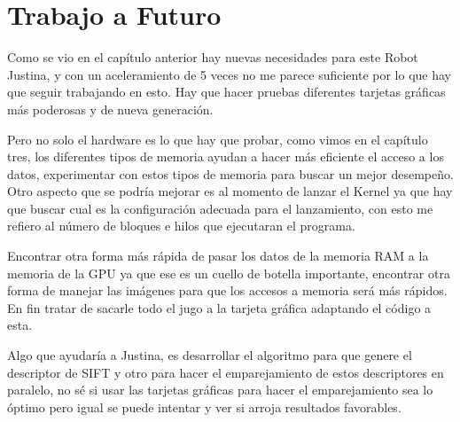  
 
 \chapter{Trabajo a Futuro}

Como se vio en el capítulo anterior hay nuevas necesidades para este Robot Justina, y con un aceleramiento de 5 veces no me parece suficiente  por lo que hay que seguir trabajando en esto. Hay que hacer pruebas diferentes tarjetas gráficas más poderosas y de nueva generación.

Pero no solo el hardware es lo que hay que probar, como vimos en el capítulo tres, los diferentes tipos de memoria ayudan a hacer más eficiente el acceso a los datos, experimentar con estos tipos de memoria para buscar un mejor desempeño. Otro aspecto que se podría mejorar es al momento de lanzar el Kernel ya que hay que buscar cual es la configuración adecuada para el lanzamiento, con esto me refiero al número de bloques e hilos que ejecutaran el programa. 

Encontrar otra forma más rápida de pasar los datos de la memoria RAM a la memoria de la GPU ya que ese es un cuello de botella importante, encontrar otra forma de manejar las imágenes para que los accesos a memoria será más rápidos. En fin tratar de sacarle todo el jugo a la tarjeta gráfica adaptando el código a esta.  

Algo que ayudaría a Justina, es desarrollar el algoritmo para que genere el descriptor de SIFT y otro para hacer el emparejamiento de estos descriptores en paralelo, no sé si usar las tarjetas gráficas para hacer el emparejamiento sea lo óptimo pero igual se puede intentar y ver si arroja resultados favorables.  
 
 
